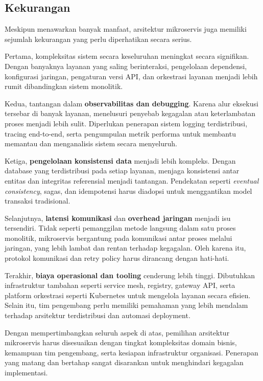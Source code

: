 \subsection{Kekurangan}

Meskipun menawarkan banyak manfaat, arsitektur mikroservis juga memiliki sejumlah kekurangan yang perlu diperhatikan secara serius.

Pertama, kompleksitas sistem secara keseluruhan meningkat secara signifikan. Dengan banyaknya layanan yang saling berinteraksi, pengelolaan dependensi, konfigurasi jaringan, pengaturan versi API, dan orkestrasi layanan menjadi lebih rumit dibandingkan sistem monolitik.

Kedua, tantangan dalam \textbf{observabilitas dan debugging}. Karena alur eksekusi tersebar di banyak layanan, menelusuri penyebab kegagalan atau keterlambatan proses menjadi lebih sulit. Diperlukan penerapan sistem logging terdistribusi, tracing end-to-end, serta pengumpulan metrik performa untuk membantu memantau dan menganalisis sistem secara menyeluruh.

Ketiga, \textbf{pengelolaan konsistensi data} menjadi lebih kompleks. Dengan database yang terdistribusi pada setiap layanan, menjaga konsistensi antar entitas dan integritas referensial menjadi tantangan. Pendekatan seperti \textit{eventual consistency}, sagas, dan idempotensi harus diadopsi untuk menggantikan model transaksi tradisional.

Selanjutnya, \textbf{latensi komunikasi} dan \textbf{overhead jaringan} menjadi isu tersendiri. Tidak seperti pemanggilan metode langsung dalam satu proses monolitik, mikroservis bergantung pada komunikasi antar proses melalui jaringan, yang lebih lambat dan rentan terhadap kegagalan. Oleh karena itu, protokol komunikasi dan retry policy harus dirancang dengan hati-hati.

Terakhir, \textbf{biaya operasional dan tooling} cenderung lebih tinggi. Dibutuhkan infrastruktur tambahan seperti service mesh, registry, gateway API, serta platform orkestrasi seperti Kubernetes untuk mengelola layanan secara efisien. Selain itu, tim pengembang perlu memiliki pemahaman yang lebih mendalam terhadap arsitektur terdistribusi dan automasi deployment.

Dengan mempertimbangkan seluruh aspek di atas, pemilihan arsitektur mikroservis harus disesuaikan dengan tingkat kompleksitas domain bisnis, kemampuan tim pengembang, serta kesiapan infrastruktur organisasi. Penerapan yang matang dan bertahap sangat disarankan untuk menghindari kegagalan implementasi.

